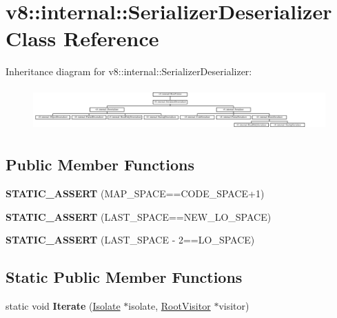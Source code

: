 \hypertarget{classv8_1_1internal_1_1SerializerDeserializer}{}\section{v8\+:\+:internal\+:\+:Serializer\+Deserializer Class Reference}
\label{classv8_1_1internal_1_1SerializerDeserializer}
Inheritance diagram for v8\+:\+:internal\+:\+:Serializer\+Deserializer\+:\begin{figure}[H]
\begin{center}
\leavevmode
\includegraphics[height=1.650943cm]{classv8_1_1internal_1_1SerializerDeserializer}
\end{center}
\end{figure}
\subsection*{Public Member Functions}
\begin{DoxyCompactItemize}
\item 
\mbox{\label{classv8_1_1internal_1_1SerializerDeserializer_a1dc8ac93022515634192f7d26aa9f6f3}} 
{\bfseries S\+T\+A\+T\+I\+C\+\_\+\+A\+S\+S\+E\+RT} (M\+A\+P\+\_\+\+S\+P\+A\+CE==C\+O\+D\+E\+\_\+\+S\+P\+A\+CE+1)
\item 
\mbox{\label{classv8_1_1internal_1_1SerializerDeserializer_ad2e858d06deb68c6b648b52a733fdb57}} 
{\bfseries S\+T\+A\+T\+I\+C\+\_\+\+A\+S\+S\+E\+RT} (L\+A\+S\+T\+\_\+\+S\+P\+A\+CE==N\+E\+W\+\_\+\+L\+O\+\_\+\+S\+P\+A\+CE)
\item 
\mbox{\label{classv8_1_1internal_1_1SerializerDeserializer_a99c2a96627f579a1f4717464db2b7283}} 
{\bfseries S\+T\+A\+T\+I\+C\+\_\+\+A\+S\+S\+E\+RT} (L\+A\+S\+T\+\_\+\+S\+P\+A\+CE -\/ 2==L\+O\+\_\+\+S\+P\+A\+CE)
\end{DoxyCompactItemize}
\subsection*{Static Public Member Functions}
\begin{DoxyCompactItemize}
\item 
\mbox{\label{classv8_1_1internal_1_1SerializerDeserializer_a3e8da34be2a643fb268c95a4db978070}} 
static void {\bfseries Iterate} (\mbox{\hyperlink{classv8_1_1internal_1_1Isolate}{Isolate}} $\ast$isolate, \mbox{\hyperlink{classv8_1_1internal_1_1RootVisitor}{Root\+Visitor}} $\ast$visitor)
\end{DoxyCompactItemize}
